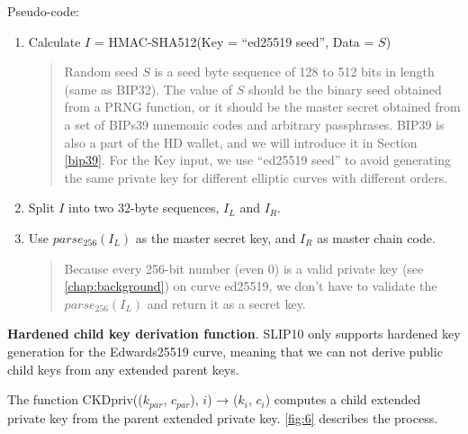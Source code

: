 Pseudo-code:

\begin{enumerate}
    \item Calculate $I$ = HMAC-SHA512(Key = “ed25519 seed”, Data = $S$)

          \begin{quote}
              Random seed $S$ is a seed byte sequence of 128 to 512 bits in length (same as BIP32). The value of $S$ should be the binary seed obtained from a PRNG function, or it should be the master secret obtained from a set of BIPs39 mnemonic codes and arbitrary passphrases. BIP39 is also a part of the HD wallet, and we will introduce it in Section \ref{bip39}. For the Key input, we use “ed25519 seed” to avoid generating the same private key for different elliptic curves with different orders.
          \end{quote}

          \bigskip

    \item Split $I$ into two 32-byte sequences, $I_L$ and $I_R$.
          \bigskip

    \item Use $parse_{256}(I_L)$ as the master secret key, and $I_R$ as master chain code.

          \begin{quote}
              Because every 256-bit number (even 0) is a valid private key (see \ref{chap:background}) on curve ed25519, we don’t have to validate the $parse_{256}(I_L)$ and return it as a secret key.
          \end{quote}
\end{enumerate}

\bigskip
{\textbf{Hardened child key derivation function}}. SLIP10 only supports hardened key generation for the Edwards25519 curve, meaning that we can not derive public child keys from any extended parent keys.

The function CKDpriv(($k_{par}$, $c_{par}$), $i$) → ($k_i$, $c_i$) computes a child extended private key from the parent extended private key. \autoref{fig:6} describes the process.

